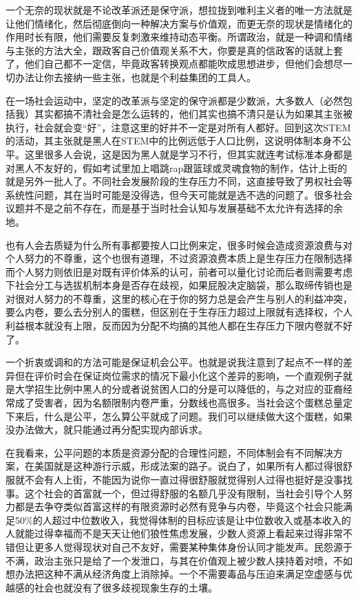 \documentclass[
]{book}
\begin{document}
一个无奈的现状就是不论改革派还是保守派，想拉拢到唯利主义者的唯一方法就是让他们情绪化，然后彻底倒向一种解决方案与价值观，而更无奈的现状是情绪化的作用时长有限，他们需要反复刺激来维持动态平衡。所谓政治，就是一种调和情绪与主张的方法大全，跟政客自己价值观关系不大，你要是真的信政客的话就上套了，他们自己都不一定信，毕竟政客转换观点都能吹成思想进步，但他们会想尽一切办法让你去接纳一些主张，也就是个利益集团的工具人。

在一场社会运动中，坚定的改革派与坚定的保守派都是少数派，大多数人（必然包括我）其实都搞不清社会是怎么运转的，他们其实也搞不清只是认为如果其主张被执行，社会就会变``好''，注意这里的好并不一定是对所有人都好。回到这次STEM的活动，其主张就是黑人在STEM中的比例远低于人口比例，这说明体制本身不公平。这里很多人会说，这是因为黑人就是学习不行，但其实就连考试标准本身都是对黑人不友好的，假如考试里加上唱跳rap跟篮球或灵魂食物的制作，估计上街的就是另外一批人了。不同社会发展阶段的生存压力不同，这直接导致了男权社会等系统性问题，其在当时可能是没得选，但今天可能就是选不选的问题了。很多社会议题并不是之前不存在，而是基于当时社会认知与发展基础不太允许有选择的余地。

也有人会去质疑为什么所有事都要按人口比例来定，很多时候会造成资源浪费与对个人努力的不尊重，这个也很有道理，不过资源浪费本质上是生存压力在限制选择而个人努力则依旧是对既有评价体系的认可，前者可以量化讨论而后者则需要考虑下社会分工与选拔机制本身是否存在歧视，如果屁股决定脑袋，那么取缔传销也是对很对人努力的不尊重，这里的核心在于你的努力总是会产生与别人的利益冲突，要么内卷，要么去分别人的蛋糕，但区别在于生存压力超过上限就有选择权，个人利益根本就没有上限，反而因为分配不均搞的其他人都在生存压力下限内卷就不好了。

一个折衷或调和的方法可能是保证机会公平。也就是说我注意到了起点不一样的差异但在评价时会在保证岗位需求的情况下最小化这个差异的影响，一个直观例子就是大学招生比例中黑人的分或者说贫困人口的分是可以降低的，与之对应的亚裔经常成了受害者，因为名额限制内卷严重，分数线也高很多。当社会这个蛋糕总量定下来后，什么是公平，怎么算公平就成了问题。我们可以继续做大这个蛋糕，如果没办法做大，就只能通过再分配实现内部诉求。

在我看来，公平问题的本质是资源分配的合理性问题，不同体制会有不同解决方案，在美国就是这种游行示威，形成法案的路子。说白了，如果所有人都过得很舒服就不会有人上街，不能因为说你一直过得很舒服就觉得别人过得也挺好是没事找事。这个社会的首富就一个，但过得舒服的名额几乎没有限制，当社会引导个人努力都是去争夺类似首富这样的有限资源时必然有竞争与内卷，毕竟这个社会只能满足50\%的人超过中位数收入，我觉得体制的目标应该是让中位数收入或基本收入的人就能过得幸福而不是天天让他们狼性焦虑发展，少数人资源上看起来过得非常不错但让更多人觉得现状对自己不友好，需要某种集体身份认同才能发声。民怨源于不满，政治主张只是给了一个发泄口，与其在价值观上被少数人挟持着对喷，不如想办法把这种不满从经济角度上消除掉。一个不需要毒品与压迫来满足空虚感与优越感的社会也就没有了很多歧视现象生存的土壤。
\end{document}
